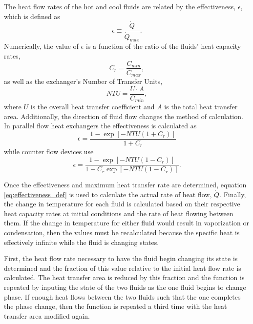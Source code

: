 The heat flow rates of the hot and cool fluids are related by the effectiveness, $\epsilon$, which is defined as 
\begin{equation}
\label{eq:effectiveness_def}
\epsilon \equiv \frac{\dot{Q}}{\dot{Q}_{max}}.
\end{equation}
Numerically, the value of $\epsilon$ is a function of the ratio of the fluids' heat capacity rates, 
\begin{equation}
C_r = \frac{C_{min}}{C_{max}},
\end{equation}
as well as the exchanger's Number of Transfer Units, 
\begin{equation}
NTU = \frac{U \cdot A}{C_{min}},
\end{equation}
where $U$ is the overall heat transfer coefficient and $A$ is the total heat transfer area. Additionally, the direction of fluid flow changes the method of calculation. In parallel flow heat exchangers the effectiveness is calculated as
\begin{equation}
\epsilon = \frac{1 - \exp\left[-NTU\left(1 + C_r\right)\right]}{1 + C_r}
\end{equation}
while counter flow devices use
\begin{equation}
\epsilon = \frac{1 - \exp\left[-NTU\left(1 - C_r\right)\right]}{1 - C_r\exp\left[-NTU\left(1 - C_r\right)\right]}.
\end{equation}

Once the effectiveness and maximum heat transfer rate are determined, equation \ref{eq:effectiveness_def} is used to calculate the actual rate of heat flow, $\dot{Q}$. Finally, the change in temperature for each fluid is calculated based on their respective heat capacity rates at initial conditions and the rate of heat flowing between them. 
If the change in temperature for either fluid would result in vaporization or condensation, then the values must be recalculated because the specific heat is effectively infinite while the fluid is changing states. 

First, the heat flow rate necessary to have the fluid begin changing its state is determined and the fraction of this value relative to the initial heat flow rate is calculated. 
The heat transfer area is reduced by this fraction and the function is repeated by inputing the state of the two fluids as the one fluid begins to change phase. If enough heat flows between the two fluids such that the one completes the phase change, then the function is repeated a third time with the heat transfer area modified again. 

